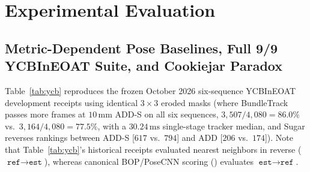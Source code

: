 \documentclass{evidencescene}
\begin{document}
\section{Experimental Evaluation}
\label{sec:experiments}

\subsection{Metric-Dependent Pose Baselines, Full 9/9 YCBInEOAT Suite, and Cookiejar Paradox}
Table~\ref{tab:ycb} reproduces the frozen October 2026 six-sequence YCBInEOAT~\cite{tracknet} development receipts using identical $3\times 3$ eroded masks (where BundleTrack passes more frames at $10\,\mathrm{mm}$ ADD-S on all six sequences, $3{,}507/4{,}080=86.0\%$ vs.\ $3{,}164/4{,}080=77.5\%$, with a $30.24\,\mathrm{ms}$ single-stage tracker median, and Sugar reverses rankings between ADD-S [$617$ vs.\ $794$] and ADD [$206$ vs.\ $174$]). Note that Table~\ref{tab:ycb}'s historical receipts evaluated nearest neighbors in reverse ($\texttt{ref}\to\texttt{est}$), whereas canonical BOP/PoseCNN scoring () evaluates $\texttt{est}\to\texttt{ref}$.

\begin{table}[t]\centering\footnotesize
\caption{Selected reference-mask YCBInEOAT development results from frozen October 2026 receipts (\texttt{ref} $\to$ \texttt{est} ADD-S). Counts are successes within $10\,\mathrm{mm}$; AUC is failure-inclusive over $0$--$100\,\mathrm{mm}$. P2P: Point2Pose; BT: BundleTrack. *Bleach-hard was selected after the five-sequence protocol.}\label{tab:ycb}

\end{table}
\end{document}
